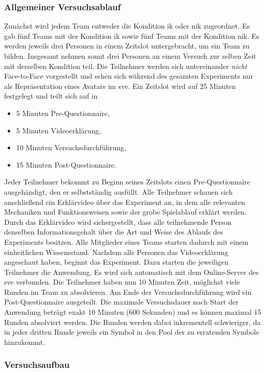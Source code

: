 \documentclass[a4paper,11pt]{article}%
\renewcommand{\\}{\vspace*{0.5\baselineskip} \newline}
\begin{document}
	\subsubsection{Allgemeiner Versuchsablauf}
Zunächst wird jedem Team entweder die Kondition \ac{ik} oder \ac{nik} zugeordnet. Es gab fünf Teams mit der Kondition \ac{ik} sowie fünf Teams mit der Kondition \ac{nik}.
Es werden jeweils drei Personen in einem Zeitslot untergebracht, um ein Team zu bilden. Insgesamt nehmen somit drei Personen an einem Versuch zur selben Zeit mit derselben Kondition teil. Die Teilnehmer werden sich untereinander \textit{nicht} Face-to-Face vorgestellt und sehen sich während des gesamten Experiments nur als Repräsentation eines Avatars im \ac{sve}. 
Ein Zeitslot wird auf 25 Minuten festgelegt und teilt sich auf in
		\begin{itemize}
			\item 5 Minuten Pre-Questionnaire,
			\item 5 Minuten Videoerklärung,
			\item 10 Minuten Versuchsdurchführung,
			\item 15 Minuten Post-Questionnaire.
		\end{itemize}
Jeder Teilnehmer bekommt zu Beginn seines Zeitslots einen Pre-Questionnaire ausgehändigt, den er selbstständig ausfüllt. Alle Teilnehmer schauen sich anschließend ein Erklärvideo über das Experiment an, in dem alle relevanten Mechaniken und Funktionsweisen sowie der grobe Spielablauf erklärt werden. Durch das Erklärvideo wird sichergestellt, dass alle teilnehmende Person denselben Informationsgehalt  über die Art und Weise des Ablaufs des Experiments besitzen. Alle Mitglieder eines Teams starten dadurch mit einem einheitlichen Wissensstand. Nachdem alle Personen das Videoerklärung angeschaut haben, beginnt das Experiment. Dazu starten die jeweiligen Teilnehmer die Anwendung. Es wird sich automatisch mit dem Online-Server des \ac{sve} verbunden. Die Teilnehmer haben nun 10 Minuten Zeit, möglichst viele Runden im Team zu absolvieren. Am Ende der Versuchsdurchführung wird ein Post-Questionnaire ausgeteilt. Die maximale Versuchsdauer nach Start der Anwendung beträgt exakt 10 Minuten (600 Sekunden) und es können maximal 15 Runden absolviert werden. Die Runden werden dabei inkrementell schwieriger, da in jeder dritten Runde jeweils ein Symbol in den Pool der zu erratenden Symbole hinzukommt.

	\subsubsection{Versuchsaufbau}
\end{document}
